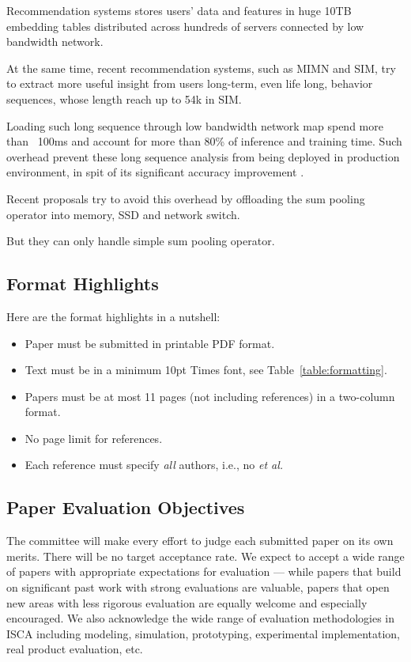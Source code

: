 \documentclass[conference]{IEEEtran}
\begin{document}
Recommendation systems stores users’ data and features in huge 10TB 
embedding tables distributed across hundreds of servers\cite{recsys_baidu_aibox}
connected by low bandwidth network.

At the same time,
recent recommendation systems,
such as MIMN\cite{recsys_mimn_alibaba} and SIM\cite{recsys_sim_alibaba},
try to extract more useful insight from users long-term, 
even life long, behavior sequences,
whose length reach up to 54k in SIM\cite{recsys_sim_alibaba}.

Loading such long sequence through low bandwidth network
map spend more than ~100ms 
and account for more than 80\% of inference
\cite{recsys_archimp_facebook_hpca20 ,recsys_deeprecsys_facebook_isca20 } 
and training \cite{recsys_traineff_facebook_hpca21 } time.
Such overhead prevent these long sequence analysis from being deployed in production environment,
in spit of its significant accuracy improvement \cite{recsys_sim_alibaba}.

Recent proposals try to avoid this overhead by offloading the sum pooling operator into 
memory\cite{recacc_tensordimm_kaist_micro19 ,recacc_recnmp_facebook_isca20 , recacc_tensorcasting_kaist_hpca21 }, 
SSD \cite{recacc_recssd_kaist_asplos21 } and  network switch\cite{ recacc_fafnir_hpca21 }.

But they can only handle simple sum pooling operator.

\subsection{Format Highlights}

Here are the format highlights in a nutshell:
\begin{itemize}
\item Paper must be submitted in printable PDF format.
\item Text must be in a minimum 10pt Times font, see Table~\ref{table:formatting}.
\item Papers must be at most 11 pages (not including references) in a
  two-column format.
\item No page limit for references.
\item Each reference must specify {\em all} authors, i.e., no {\em et al.}
\end{itemize}

\subsection{Paper Evaluation Objectives}
The committee will make every effort to judge each submitted paper on
its own merits. There will be no target acceptance rate. We expect to
accept a wide range of papers with appropriate expectations for
evaluation --- while papers that build on significant past work with
strong evaluations are valuable, papers that open new areas with less
rigorous evaluation are equally welcome and especially encouraged. We
also acknowledge the wide range of evaluation methodologies in ISCA including
modeling, simulation, prototyping, experimental implementation, real
product evaluation, etc.
\end{document}
